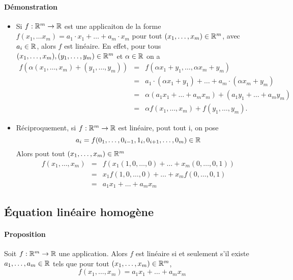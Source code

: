 \paragraph{Démonstration}
\begin{itemize}
  \item Si $f: \mathbb{R}^m \rightarrow \mathbb{R}$ est une applicaiton de la forme $f(x_1, \ldots x_m) = a_1 \cdot x_1 + \ldots + a_m \cdot x_m$ pour tout $(x_1, \ldots, x_m) \in \mathbb{R}^m$, avec $a_i \in \mathbb{R}$, alors $f$ est linéaire. En effet, pour tous $(x_1, \ldots, x_m), (y_1, \ldots, y_m) \in \mathbb{R}^m$ et $\alpha \in \mathbb{R}$ on a
    \begin{eqnarray*}
      f(\alpha(x_1, \ldots, x_m) + (y_1, \ldots, y_m)) &=& f(\alpha x_1 + y_1, \ldots, \alpha x_m + y_m) \\
        &=& a_1 \cdot (\alpha x_1 + y_1) + \ldots + a_m \cdot (\alpha x_m + y_m) \\
        &=& \alpha (a_1 x_1 + \ldots + a_m x_m) + (a_1 y_1 + \ldots + a_m y_m) \\
        &=& \alpha f(x_1, \ldots, x_m) + f(y_1, \ldots, y_m).
    \end{eqnarray*}
  \item Réciproquement, si $f: \mathbb{R}^m \rightarrow \mathbb{R}$ est linéaire, pout tout i, on pose 
    $$a_i = f(0_1, \ldots, 0_{i-1}, 1_i, 0_{i+1}, \ldots, 0_m) \in \mathbb{R}$$
    Alors pout tout $(x_1, \ldots, x_m) \in \mathbb{R}^m$
    \begin{eqnarray*}
      f(x_1, \ldots, x_m) &=& f(x_1 (1, 0, \ldots, 0) + \ldots + x_m (0, \ldots, 0, 1)) \\
        &=& x_1 f(1, 0, \ldots, 0) + \ldots + x_m f(0, \ldots, 0, 1) \\
        &=& a_1 x_1 + \ldots + a_m x_m
    \end{eqnarray*}
\end{itemize}

%
\subsection{Équation linéaire homogène}
%

\paragraph{Proposition} Soit $f: \mathbb{R}^m \rightarrow \mathbb{R}$ une application. Alors $f$ est linéaire si et seulement s'il existe $a_1, \ldots, a_m \in \mathbb{R}$ tels que pour tout $(x_1, \ldots, x_m) \in \mathbb{R}^m$,
$$f(x_1, \ldots, x_m) = a_1 x_1 + \ldots + a_m x_m$$

